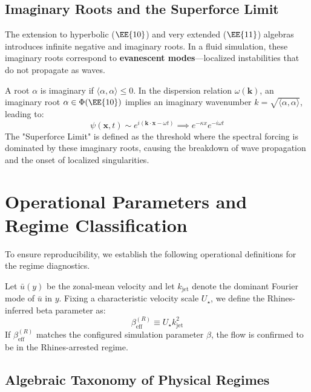 \subsection{Imaginary Roots and the Superforce Limit}

The extension to hyperbolic ($\EE{10}$) and very extended ($\EE{11}$) algebras introduces infinite negative and imaginary roots. In a fluid simulation, these imaginary roots correspond to \textbf{evanescent modes}—localized instabilities that do not propagate as waves.

\begin{definition}
A root $\alpha$ is imaginary if $\langle \alpha, \alpha \rangle \le 0$. In the dispersion relation $\omega(\mathbf{k})$, an imaginary root $\alpha \in \Phi(\EE{10})$ implies an imaginary wavenumber $k = \sqrt{\langle \alpha, \alpha \rangle}$, leading to:
\begin{equation}
    \psi(\mathbf{x}, t) \sim e^{i(\mathbf{k}\cdot\mathbf{x} - \omega t)} \implies e^{-\kappa x} e^{-i\omega t}
\end{equation}
The "Superforce Limit" is defined as the threshold where the spectral forcing is dominated by these imaginary roots, causing the breakdown of wave propagation and the onset of localized singularities.
\end{definition}



\section{Operational Parameters and Regime Classification}

To ensure reproducibility, we establish the following operational definitions for the regime diagnostics.

\begin{definition}
Let $\bar{u}(y)$ be the zonal-mean velocity and let $k_{\mathrm{jet}}$ denote the dominant Fourier mode of $\bar{u}$ in $y$. Fixing a characteristic velocity scale $U_\star$, we define the Rhines-inferred beta parameter as:
\begin{equation}
    \beta_{\mathrm{eff}}^{(R)} \equiv U_\star k_{\mathrm{jet}}^2
\end{equation}
If $\beta_{\mathrm{eff}}^{(R)}$ matches the configured simulation parameter $\beta$, the flow is confirmed to be in the Rhines-arrested regime.
\end{definition}

\subsection{Algebraic Taxonomy of Physical Regimes}


